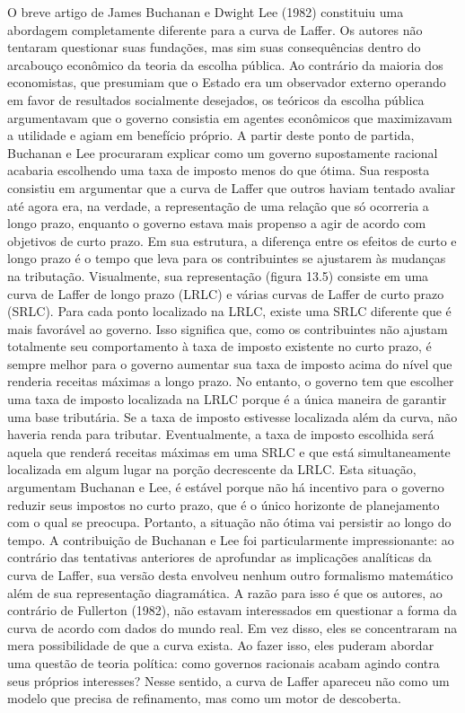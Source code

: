 \documentclass[a4paper,12pt]{article}[abntex2]
\begin{document}
O breve artigo de James Buchanan e Dwight Lee (1982) constituiu uma abordagem completamente diferente para a curva de Laffer. Os autores não tentaram questionar suas fundações, mas sim suas consequências dentro do arcabouço econômico da teoria da escolha pública. Ao contrário da maioria dos economistas, que presumiam que o Estado era um observador externo operando em favor de resultados socialmente desejados, os teóricos da escolha pública argumentavam que o governo consistia em agentes econômicos que maximizavam a utilidade e agiam em benefício próprio. A partir deste ponto de partida, Buchanan e Lee procuraram explicar como um governo supostamente racional acabaria escolhendo uma taxa de imposto menos do que ótima. Sua resposta consistiu em argumentar que a curva de Laffer que outros haviam tentado avaliar até agora era, na verdade, a representação de uma relação que só ocorreria a longo prazo, enquanto o governo estava mais propenso a agir de acordo com objetivos de curto prazo. Em sua estrutura, a diferença entre os efeitos de curto e longo prazo é o tempo que leva para os contribuintes se ajustarem às mudanças na tributação. Visualmente, sua representação (figura 13.5) consiste em uma curva de Laffer de longo prazo (LRLC) e várias curvas de Laffer de curto prazo (SRLC). Para cada ponto localizado na LRLC, existe uma SRLC diferente que é mais favorável ao governo. Isso significa que, como os contribuintes não ajustam totalmente seu comportamento à taxa de imposto existente no curto prazo, é sempre melhor para o governo aumentar sua taxa de imposto acima do nível que renderia receitas máximas a longo prazo. No entanto, o governo tem que escolher uma taxa de imposto localizada na LRLC porque é a única maneira de garantir uma base tributária. Se a taxa de imposto estivesse localizada além da curva, não haveria renda para tributar. Eventualmente, a taxa de imposto escolhida será aquela que renderá receitas máximas em uma SRLC e que está simultaneamente localizada em algum lugar na porção decrescente da LRLC. Esta situação, argumentam Buchanan e Lee, é estável porque não há incentivo para o governo reduzir seus impostos no curto prazo, que é o único horizonte de planejamento com o qual se preocupa. Portanto, a situação não ótima vai persistir ao longo do tempo. A contribuição de Buchanan e Lee foi particularmente impressionante: ao contrário das tentativas anteriores de aprofundar as implicações analíticas da curva de Laffer, sua versão desta envolveu nenhum outro formalismo matemático além de sua representação diagramática. A razão para isso é que os autores, ao contrário de Fullerton (1982), não estavam interessados em questionar a forma da curva de acordo com dados do mundo real. Em vez disso, eles se concentraram na mera possibilidade de que a curva exista. Ao fazer isso, eles puderam abordar uma questão de teoria política: como governos racionais acabam agindo contra seus próprios interesses? Nesse sentido, a curva de Laffer apareceu não como um modelo que precisa de refinamento, mas como um motor de descoberta.
\end{document}
